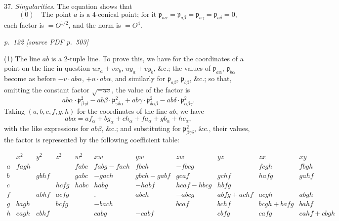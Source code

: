 \documentclass[11pt,a4paper]{article}
\newcommand{\sourcepage}[2]{%
  \bigskip
  \noindent\textit{p.~#1 [source PDF p.~#2]}%
  \par\smallskip
}
\newcommand{\p}{\mathfrak p}
\newcommand{\sym}[1]{\mathit{#1}}
\newcommand{\surf}[1]{\par\smallskip\noindent{\itshape \{Surface $#1$.\}}\par\smallskip}
\begin{document}
37. \textit{Singularities.} The equation shows that
\[
(0)\quad
\text{The point }a\text{ is a 4-conical point; for it }
\p_{a\alpha}=\p_{a\beta}=\p_{a\gamma}=\p_{a\delta}=0,
\]
each factor is $=O^{1/2}$, and the norm is $=O^4$.
\surf{ab\alpha\beta\gamma\delta}

\sourcepage{122}{503}
(1) The line $ab$ is a 2-tuple line. To prove this, we have for the coordinates
of a point on the line in question $ux_a+vx_b$, $uy_a+vy_b$, \&c.; the values
of $\p_{a\alpha}$, $\p_{b\alpha}$ become as before $-v\cdot ab\alpha$, $+u\cdot ab\alpha$,
and similarly for $\p_{a\beta}$, $\p_{b\beta}$, \&c.; so that, omitting the constant
factor $\sqrt{-uv}$, the value of the factor is
\[
ab\alpha\cdot\p^2_{\beta\gamma\delta}
-ab\beta\cdot\p^2_{\gamma\delta\alpha}
+ab\gamma\cdot\p^2_{\delta\alpha\beta}
-ab\delta\cdot\p^2_{\alpha\beta\gamma}.
\]
Taking $(a,b,c,f,g,h)$ for the coordinates of the line $ab$, we have
\[
ab\alpha=af_\alpha+bg_\alpha+ch_\alpha+fa_\alpha+gb_\alpha+hc_\alpha,
\]
with the like expressions for $ab\beta$, \&c.; and substituting for
$\p^2_{\beta\gamma\delta}$, \&c., their values, the factor is represented by the
following coefficient table:

\begin{landscape}
\[
\renewcommand{\arraystretch}{1.25}
\begin{array}{c|cccccccccc}
 &x^2&y^2&z^2&w^2&xw&yw&zw&yz&zx&xy\\ \hline
a&\sym{fagh}&&&\sym{fabc}&\sym{fabg}-\sym{fach}&\sym{fbch}&-\sym{fbcg}&&\sym{fcgh}&\sym{fbgh}\\
b&&\sym{gbhf}&&\sym{gabc}&-\sym{gach}&\sym{gbch}-\sym{gabf}&\sym{gcaf}&\sym{gchf}&\sym{hafg}&\sym{gahf}\\
c&&&\sym{hcfg}&\sym{habc}&\sym{habg}&-\sym{habf}&\sym{hcaf}-\sym{hbcg}&\sym{hbfg}&&\\
f&&\sym{abhf}&\sym{acfg}&&.&\sym{abch}&-\sym{abcg}&\sym{abfg}+\sym{achf}&\sym{acgh}&\sym{abgh}\\
g&\sym{bagh}&&\sym{bcfg}&&-\sym{bach}&&\sym{bcaf}&\sym{bchf}&\sym{bcgh}+\sym{bafg}&\sym{bahf}\\
h&\sym{cagh}&\sym{cbhf}&&&\sym{cabg}&-\sym{cabf}&&\sym{cbfg}&\sym{cafg}&\sym{cahf}+\sym{cbgh}
\end{array}
\]
\end{landscape}
\end{document}
